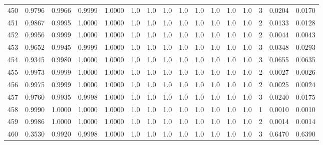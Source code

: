 \begin{tabular}{lrrrrrrrrrrrrrrr}
450 &      0.9796 &  0.9966 &  0.9999 &  1.0000 &     1.0 &     1.0 &     1.0 &     1.0 &     1.0 &     1.0 &      1.0 &        1.0 &      3 &                    0.0204 &                     0.0170 \\
451 &      0.9867 &  0.9995 &  1.0000 &  1.0000 &     1.0 &     1.0 &     1.0 &     1.0 &     1.0 &     1.0 &      1.0 &        1.0 &      2 &                    0.0133 &                     0.0128 \\
452 &      0.9956 &  0.9999 &  1.0000 &  1.0000 &     1.0 &     1.0 &     1.0 &     1.0 &     1.0 &     1.0 &      1.0 &        1.0 &      2 &                    0.0044 &                     0.0043 \\
453 &      0.9652 &  0.9945 &  0.9999 &  1.0000 &     1.0 &     1.0 &     1.0 &     1.0 &     1.0 &     1.0 &      1.0 &        1.0 &      3 &                    0.0348 &                     0.0293 \\
454 &      0.9345 &  0.9980 &  1.0000 &  1.0000 &     1.0 &     1.0 &     1.0 &     1.0 &     1.0 &     1.0 &      1.0 &        1.0 &      3 &                    0.0655 &                     0.0635 \\
455 &      0.9973 &  0.9999 &  1.0000 &  1.0000 &     1.0 &     1.0 &     1.0 &     1.0 &     1.0 &     1.0 &      1.0 &        1.0 &      2 &                    0.0027 &                     0.0026 \\
456 &      0.9975 &  0.9999 &  1.0000 &  1.0000 &     1.0 &     1.0 &     1.0 &     1.0 &     1.0 &     1.0 &      1.0 &        1.0 &      2 &                    0.0025 &                     0.0024 \\
457 &      0.9760 &  0.9935 &  0.9998 &  1.0000 &     1.0 &     1.0 &     1.0 &     1.0 &     1.0 &     1.0 &      1.0 &        1.0 &      3 &                    0.0240 &                     0.0175 \\
458 &      0.9990 &  1.0000 &  1.0000 &  1.0000 &     1.0 &     1.0 &     1.0 &     1.0 &     1.0 &     1.0 &      1.0 &        1.0 &      1 &                    0.0010 &                     0.0010 \\
459 &      0.9986 &  1.0000 &  1.0000 &  1.0000 &     1.0 &     1.0 &     1.0 &     1.0 &     1.0 &     1.0 &      1.0 &        1.0 &      2 &                    0.0014 &                     0.0014 \\
460 &      0.3530 &  0.9920 &  0.9998 &  1.0000 &     1.0 &     1.0 &     1.0 &     1.0 &     1.0 &     1.0 &      1.0 &        1.0 &      3 &                    0.6470 &                     0.6390 \\

\end{tabular}

